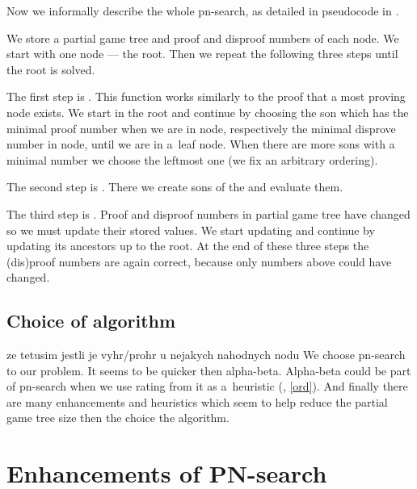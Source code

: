 Now we informally describe the whole pn-search, as detailed in pseudocode in
. 

We store a partial game tree and proof and disproof numbers of each node. We
start with one node --- the root. Then we repeat the following three steps
until the root is solved. 

The first step is . This function works similarly
to the proof that a most proving node exists.  We start in the
root and continue by choosing the son which has the minimal proof number when
we are in  node, respectively the minimal  disprove number in
 node, until we are in a~leaf node. When there are more sons with a
minimal number we choose the leftmost one (we fix an arbitrary ordering). 

The second step is . There we create sons of
the  and evaluate them.

The third step is . Proof and disproof
numbers in partial game tree have changed so we must update their stored
values. We start updating  and continue by updating its
ancestors up to the root. At the end of these three steps the (dis)proof numbers
are again correct, because only numbers above  could have
changed.


\subsection{Choice of algorithm}

ze tetusim jestli je vyhr/prohr u nejakych nahodnych nodu
We choose pn-search to our problem. It seems to be quicker then alpha-beta.  Alpha-beta
could be part of pn-search when we use rating from it as a~heuristic (, \ref{ord}).
And finally there are many enhancements and heuristics which seem to help reduce the partial game tree size  
then the choice the algorithm.

\section{Enhancements of PN-search}


